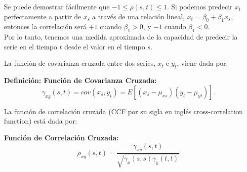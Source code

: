 Se puede demostrar f\'acilmente que $-1 \le \rho(s,t) \le 1$. Si podemos predecir $x_t$ perfectamente a partir de $x_s$ a trav\'es de una relaci\'on lineal, $x_t = \beta_0 + \beta_1 x_s$, entonces la correlaci\'on ser\'a $+1$ cuando $\beta_1 > 0$, y $-1$ cuando $\beta_1 < 0$. \\
Por lo tanto, tenemos una medida aproximada de la capacidad de predecir la serie en el tiempo $t$ desde el valor en el tiempo $s$.



La funci\'on de covarianza cruzada entre dos series, $x_t$ e $y_t$, viene dada por:
\vspace{5mm}

\begin{definition}\label{def:def5}
	\textbf{Definici\'on: Funci\'on de Covarianza Cruzada:}
\begin{equation*}
\gamma_{xy} (s, t) = cov (x_s, y_t) = E [(x_s -\mu_{xs}) (y_t - \mu_{yt})].
\end{equation*}
\end{definition}
La funci\'on de correlaci\'on cruzada (CCF por su sigla en ingl\'es cross-correlation function) est\'a dada por:
\vspace{5mm}

\begin{definition}\label{def:def6}
\textbf{Funci\'on de Correlaci\'on Cruzada:}
\begin{equation*}
\rho_{xy} (s, t) = \frac{\gamma_{xy}(s,t)}{ \sqrt{\gamma_x(s,s) \gamma_y(t,t)}}
\end{equation*}

\end{definition} 

